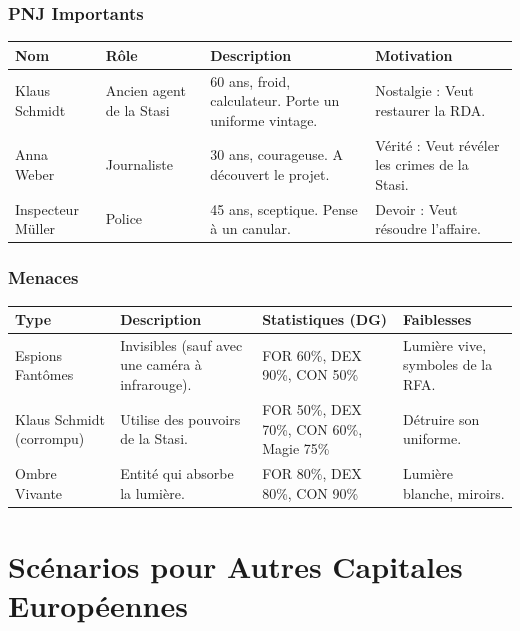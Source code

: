 \documentclass[10pt,a5paper,twoside]{book}
\begin{document}
\newpage

\subsubsection*{PNJ Importants}
\begin{center}
	\begin{tabular}{|P{2cm}|P{3cm}|P{3.5cm}|P{2.5cm}|}
	\hline
	\textbf{Nom} 		& \textbf{Rôle} 			& \textbf{Description} 										& \textbf{Motivation} \\ \hline
	Klaus Schmidt 		& Ancien agent de la Stasi 	& 60 ans, froid, calculateur. Porte un uniforme vintage. 	& Nostalgie : Veut restaurer la RDA. \\ \hline
	Anna Weber 			& Journaliste 				& 30 ans, courageuse. A découvert le projet. 				& Vérité : Veut révéler les crimes de la Stasi. \\ \hline
	Inspecteur Müller 	& Police 					& 45 ans, sceptique. Pense à un canular. 					& Devoir : Veut résoudre l'affaire. \\ \hline
	\end{tabular}
\end{center}

\subsubsection*{Menaces}
\begin{center}
	\begin{tabular}{|P{2cm}|P{3cm}|P{3.5cm}|P{2.5cm}|}
	\hline
	\textbf{Type} 				& \textbf{Description} 								& \textbf{Statistiques (DG)} 				& \textbf{Faiblesses} \\ \hline
	Espions Fantômes 			& Invisibles (sauf avec une caméra à infrarouge). 	& FOR 60\%, DEX 90\%, CON 50\% 				& Lumière vive, symboles de la RFA. \\ \hline
	Klaus Schmidt (corrompu) 	& Utilise des pouvoirs de la Stasi. 				& FOR 50\%, DEX 70\%, CON 60\%, Magie 75\% 	& Détruire son uniforme. \\ \hline
Ombre Vivante 				& Entité qui absorbe la lumière. 					& FOR 80\%, DEX 80\%, CON 90\% 				& Lumière blanche, miroirs. \\ \hline
	\end{tabular}
\end{center}

\newpage
	
\section{Scénarios pour Autres Capitales Européennes}
\end{document}
